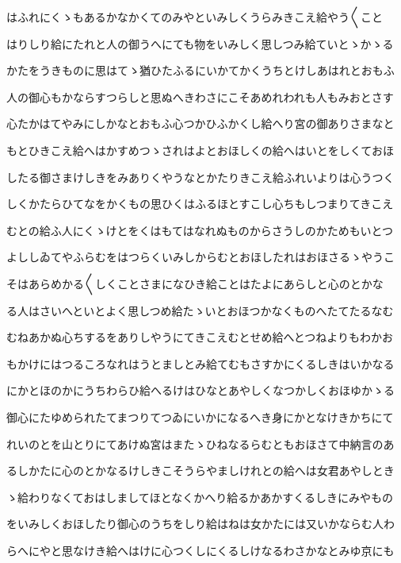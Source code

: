 \documentclass[a4paper,11pt,landscape]{ltjtarticle}
\begin{document}
\par\medskip
はふれにくゝもあるかなかくてのみやといみしくうらみきこえ給やう〱こと
\par\medskip
はりしり給にたれと人の御うへにても物をいみしく思しつみ給ていとゝかゝる
\par\medskip
かたをうきものに思はてゝ猶ひたふるにいかてかくうちとけしあはれとおもふ
\par\medskip
人の御心もかならすつらしと思ぬへきわさにこそあめれわれも人もみおとさす
\par\medskip
心たかはてやみにしかなとおもふ心つかひふかくし給へり宮の御ありさまなと
\par\medskip
もとひきこえ給へはかすめつゝされはよとおほしくの給へはいとをしくておほ
\par\medskip
したる御さまけしきをみありくやうなとかたりきこえ給ふれいよりは心うつく
\par\medskip
しくかたらひてなをかくもの思ひくはふるほとすこし心ちもしつまりてきこえ
\par\medskip
むとの給ふ人にくゝけとをくはもてはなれぬものからさうしのかためもいとつ
\par\medskip
よししゐてやふらむをはつらくいみしからむとおほしたれはおほさるゝやうこ
\par\medskip
そはあらめかる〱しくことさまになひき給ことはたよにあらしと心のとかな
\par\medskip
る人はさいへといとよく思しつめ給たゝいとおほつかなくものへたてたるなむ
\par\medskip
むねあかぬ心ちするをありしやうにてきこえむとせめ給へとつねよりもわかお
\par\medskip
もかけにはつるころなれはうとましとみ給てむもさすかにくるしきはいかなる
\par\medskip
にかとほのかにうちわらひ給へるけはひなとあやしくなつかしくおほゆかゝる
\par\medskip
御心にたゆめられたてまつりてつゐにいかになるへき身にかとなけきかちにて
\par\medskip
れいのとを山とりにてあけぬ宮はまたゝひねなるらむともおほさて中納言のあ
\par\medskip
るしかたに心のとかなるけしきこそうらやましけれとの給へは女君あやしとき
\par\medskip
ゝ給わりなくておはしましてほとなくかへり給るかあかすくるしきにみやもの
\par\medskip
をいみしくおほしたり御心のうちをしり給はねは女かたには又いかならむ人わ
\par\medskip
らへにやと思なけき給へはけに心つくしにくるしけなるわさかなとみゆ京にも
\end{document}
